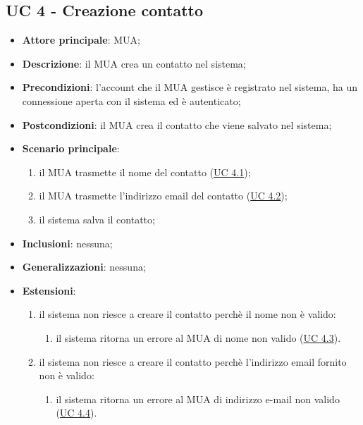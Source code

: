 \subsection{UC 4 - Creazione contatto} \label{sec:UC4}
    \begin{itemize}
        \item \textbf{Attore principale}: MUA;
        \item \textbf{Descrizione}: il MUA crea un contatto nel sistema;
        \item \textbf{Precondizioni}: l’account che il MUA gestisce è registrato nel sistema, ha un connessione aperta con il sistema ed è autenticato;
        \item \textbf{Postcondizioni}: il MUA crea il contatto che viene salvato nel sistema;
        \item \textbf{Scenario principale}:
            \begin{enumerate}
                \item il MUA trasmette il nome del contatto (\hyperref[sec:UC4.1]{UC 4.1});
                \item il MUA trasmette l'indirizzo email del contatto (\hyperref[sec:UC4.2]{UC 4.2});
                \item il sistema salva il contatto;
            \end{enumerate}
        \item \textbf{Inclusioni}: nessuna;
        \item \textbf{Generalizzazioni}: nessuna;
        \item \textbf{Estensioni}:         
        \begin{enumerate}[label=\alph*.]
            \item il sistema non riesce a creare il contatto perchè il nome non è valido:
            \begin{enumerate}[label=\arabic*.]
                \item il sistema ritorna un errore al MUA di nome non valido (\hyperref[sec:UC4.3]{UC 4.3}).
            \end{enumerate}
            \item il sistema non riesce a creare il contatto perchè l'indirizzo email fornito non è valido:
            \begin{enumerate}[label=\arabic*.]
                \item il sistema ritorna un errore al MUA di indirizzo e-mail non valido (\hyperref[sec:UC4.4]{UC 4.4}).
            \end{enumerate}
        \end{enumerate}
    \end{itemize}

